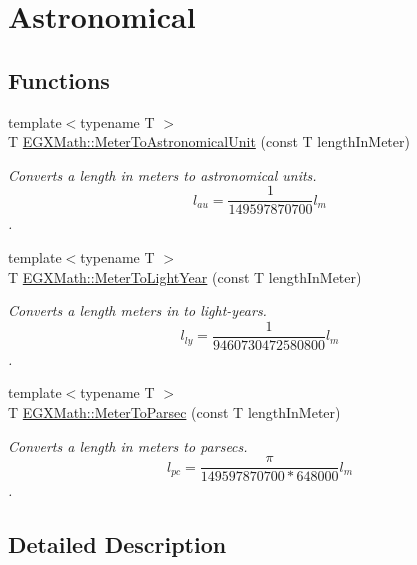 \hypertarget{group___e_g_x_math-_conversions-_length_conversions-_meter-_astronomical}{}\section{Astronomical}
\label{group___e_g_x_math-_conversions-_length_conversions-_meter-_astronomical}
\subsection*{Functions}
\begin{DoxyCompactItemize}
\item 
{\footnotesize template$<$typename T $>$ }\\T \mbox{\hyperlink{group___e_g_x_math-_conversions-_length_conversions-_meter-_astronomical_gadf1e5c63bba613fab5b94704df71994d}{E\+G\+X\+Math\+::\+Meter\+To\+Astronomical\+Unit}} (const T length\+In\+Meter)
\begin{DoxyCompactList}\small\item\em Converts a length in meters to astronomical units. \[ l_{au}= \frac{1}{149597870700} l_{m} \]. \end{DoxyCompactList}\item 
{\footnotesize template$<$typename T $>$ }\\T \mbox{\hyperlink{group___e_g_x_math-_conversions-_length_conversions-_meter-_astronomical_ga0dbb6d8e5d002475c0335934326b27d7}{E\+G\+X\+Math\+::\+Meter\+To\+Light\+Year}} (const T length\+In\+Meter)
\begin{DoxyCompactList}\small\item\em Converts a length meters in to light-\/years. \[ l_{ly}= \frac{1}{9460730472580800} l_{m} \]. \end{DoxyCompactList}\item 
{\footnotesize template$<$typename T $>$ }\\T \mbox{\hyperlink{group___e_g_x_math-_conversions-_length_conversions-_meter-_astronomical_ga326ca8b69fece7b50052e3f319d5ce5a}{E\+G\+X\+Math\+::\+Meter\+To\+Parsec}} (const T length\+In\+Meter)
\begin{DoxyCompactList}\small\item\em Converts a length in meters to parsecs. \[ l_{pc}=\frac{\pi}{149597870700 * 648000} l_{m} \]. \end{DoxyCompactList}\end{DoxyCompactItemize}


\subsection{Detailed Description}


